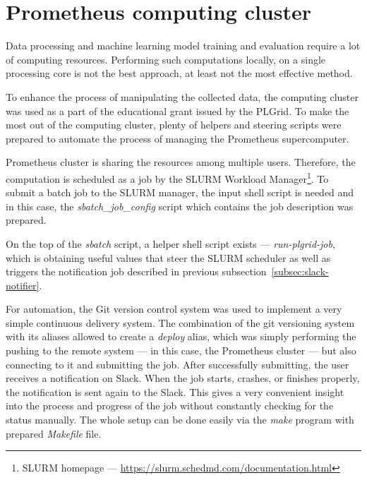 \section{Prometheus computing cluster}\label{sec:prometheus-computing-cluster}
Data processing and machine learning model training and evaluation require a lot of computing resources.
Performing such computations locally, on a single processing core is not the best approach, at least not the most effective method.

To enhance the process of manipulating the collected data, the computing cluster was used as a part of the educational grant issued by the PLGrid.
To make the most out of the computing cluster, plenty of helpers and steering scripts were prepared to automate the process of managing the Prometheus supercomputer.

Prometheus cluster is sharing the resources among multiple users.
Therefore, the computation is scheduled as a job by the SLURM Workload Manager\footnote{SLURM homepage --- \url{https://slurm.schedmd.com/documentation.html}}.
To submit a batch job to the SLURM manager, the input shell script is needed and in this case, the \textit{sbatch\_job\_config} script which contains the job description was prepared.

On the top of the \textit{sbatch} script, a helper shell script exists --- \textit{run-plgrid-job}, which is obtaining useful values that steer the SLURM scheduler as well as triggers the notification job described in previous subsection~\ref{subsec:slack-notifier}.

For automation, the Git version control system was used to implement a very simple continuous delivery system.
The combination of the git versioning system with its aliases allowed to create a \textit{deploy} alias, which was simply performing the pushing to the remote system --- in this case, the Prometheus cluster --- but also connecting to it and submitting the job.
After successfully submitting, the user receives a notification on Slack.
When the job starts, crashes, or finishes properly, the notification is sent again to the Slack.
This gives a very convenient insight into the process and progress of the job without constantly checking for the status manually.
The whole setup can be done easily via the \textit{make} program with prepared \textit{Makefile} file.
